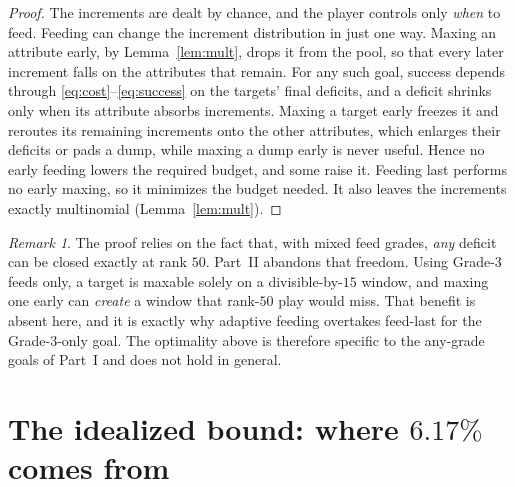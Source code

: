 \documentclass[11pt]{article}
\theoremstyle{remark}
\newtheorem{remark}{Remark}
\begin{document}
\begin{proof}
The increments are dealt by chance, and the player controls only \emph{when} to
feed. Feeding can change the increment distribution in just one way. Maxing an
attribute early, by Lemma~\ref{lem:mult}, drops it from the pool, so that every
later increment falls on the attributes that remain. For any such goal, success
depends through \eqref{eq:cost}--\eqref{eq:success} on the targets' final deficits,
and a deficit shrinks only when its attribute absorbs increments. Maxing a target
early freezes it and reroutes its remaining increments onto the other attributes,
which enlarges their deficits or pads a dump, while maxing a dump early is never
useful. Hence no early feeding lowers the required budget, and some raise it. Feeding
last performs no early maxing, so it minimizes the budget needed. It also leaves the
increments exactly multinomial (Lemma~\ref{lem:mult}).
\end{proof}

\begin{remark}
The proof relies on the fact that, with mixed feed grades, \emph{any} deficit can be
closed exactly at rank $50$. Part~II abandons that freedom. Using Grade-3 feeds
only, a target is maxable solely on a divisible-by-$15$ window, and maxing one early
can \emph{create} a window that rank-$50$ play would miss. That benefit is absent
here, and it is exactly why adaptive feeding overtakes feed-last for the
Grade-3-only goal. The optimality above is therefore specific to the any-grade goals
of Part~I and does not hold in general.
\end{remark}

\section{The idealized bound: where \texorpdfstring{$6.17\%$}{6.17\%} comes from}\label{sec:naive}
\end{document}
